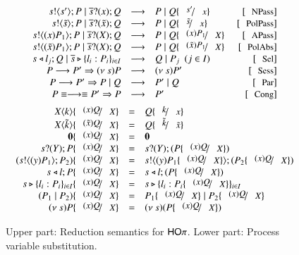 \begin{figure}
\[
	\begin{array}{c}
		\begin{array}{rclr}
			\bout{s}{s'} P \Par \binp{\dual{s}}{x} Q & \red & P \Par Q \subst{s'}{x} & \orule{NPass} \\
			\bout{s}{\tilde{s}} P \Par \binp{\dual{s}}{\tilde{x}} Q & \red & P \Par Q \subst{\tilde{s}}{{x}} & \orule{PolPass}\\
			\bout{s}{\abs{x}{P_1}} P \Par \binp{\dual{s}}{\X} Q & \red & P \Par Q \subst{\abs{x}{P_1}}{\X}\ & \orule{APass} \\
			\bout{s}{\abs{\tilde{x}}{P_1}} P \Par \binp{\dual{s}}{\X} Q & \red & P \Par Q \subst{\abs{\tilde{x}}{P_1}}{\X}\ & \orule{PolAbs} \\
			\bsel{s}{l_j} Q \Par \bbra{\dual{s}}{l_i : P_i}_{i \in I} & \red & Q \Par P_j ~~(j \in I)~~  & \orule{Sel}\\
			P \red P' \Rightarrow \news{s} P & \red & \news{s} P'  & \orule{Sess} \\
			P \red P' \Rightarrow   P \Par Q & \red &  P' \Par Q  & \orule{Par} \\
			P \scong \red \scong P' \Rightarrow P & \red & P' & \orule{Cong}
		\end{array}
		\vspace{2mm} \\
		\begin{array}{rcl}
			\appl{X}{k} \subst{\abs{x}{Q}}{\X} & = & Q \subst{k}{x} \\
			\appl{X}{\tilde{k}} \subst{\abs{\tilde{x}}{Q}}{\X} & = & Q \subst{\tilde{k}}{\tilde{x}} \\
			\inact \subst{\abs{x}{Q}}{\X} & = &  \inact
			\\
			\binp{s}{\Y} P \subst{\abs{x}{Q}}{\X} & = &  \binp{s}{\Y} (P \subst{\abs{x}{Q}}{\X})
			\\
			(\bout{s}{\abs{y}{P_1}} P_2) \subst{\abs{x}{Q}}{\X} & = & \bout{s}{\abs{y}{P_1 \subst{\abs{x}{Q}}{\X}}} (P_2 \subst{\abs{x}{Q}}{\X})
			\\
			\bsel{s}{l} P \subst{\abs{x}{Q}}{\X} & = & \bsel{s}{l} (P \subst{\abs{x}{Q}}{\X})
			\\
			\bbra{s}{l_i : P_i}_{i \in I} \subst{\abs{x}{Q}}{\X} & = & \bbra{s}{l_i : P_i \subst{\abs{x}{Q}}{\X}}_{i \in I}
			\\
			(P_1 \Par P_2) \subst{\abs{x}{Q}}{\X} & = & P_1 \subst{\abs{x}{Q}}{\X} \Par P_2 \subst{\abs{x}{Q}}{\X}
			\\
			\news{s} P \subst{\abs{x}{Q}}{\X} & = & \news{s} (P \subst{\abs{x}{Q}}{\X})
		\end{array}
	\end{array}
\]
	\caption{Upper part: Reduction semantics for $\mathsf{HO}\pi$. Lower part: Process variable substitution. \label{fig:reduction}}
\end{figure}
